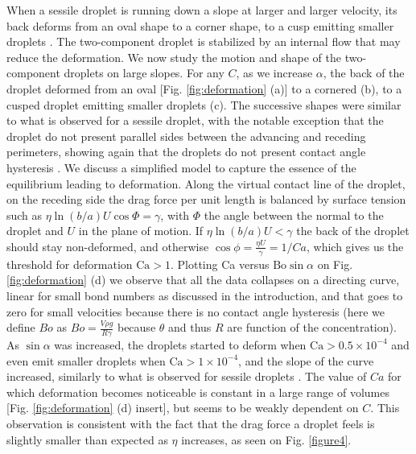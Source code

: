 \documentclass[aps,prl,reprint,superscriptaddress,amsmath,amssymb,]{revtex4-1}
\begin{document}
When a sessile droplet is running down a slope at larger and larger velocity, its back deforms from an oval shape to a corner shape, to a cusp emitting smaller droplets \cite{Podgorski-2001, LeGrand-2005}. The two-component droplet is stabilized by an internal flow that may reduce the deformation. We now study the motion and shape of the two-component droplets on large slopes. For any $C$, as we increase $\alpha$, the back of the droplet deformed from an oval [Fig. \ref{fig:deformation} (a)] to a cornered (b), to a cusped droplet emitting smaller droplets (c). The successive shapes were similar to what is observed for a sessile droplet, with the notable exception that the droplet do not present parallel sides between the advancing and receding perimeters, showing again that the droplets do not present contact angle hysteresis \cite{dussan1983ability, huethorst1991motion}. We discuss a simplified model to capture the essence of the equilibrium leading to deformation. Along the virtual contact line of the droplet, on the receding side the drag force per unit length is balanced by surface tension such as $\eta \ln (b/a) U \cos{\Phi}= \gamma$, with $\Phi$ the angle between the normal to the droplet and $U$ in the plane of motion. If $\eta \ln (b/a) U < \gamma$ the back of the droplet should stay non-deformed, and otherwise  $\cos{\phi}= \frac{\eta U}{\gamma}= 1/Ca$, which gives us the threshold for deformation  $\mathrm{Ca}>1$. Plotting Ca versus $\mathrm{Bo} \sin{\alpha}$ on Fig. \ref{fig:deformation} (d) we observe that all the data collapses on a directing curve, linear for small bond numbers as discussed in the introduction, and that goes to zero for small velocities because there is no contact angle hysteresis (here we define $Bo$ as $Bo=\frac{V \rho g}{R \gamma}$ because $\theta$ and thus $R$ are function of the concentration). As $\sin{\alpha}$ was increased, the droplets started to deform when $\mathrm{Ca}>0.5 \times 10^{-4}$ and even emit smaller droplets when $\mathrm{Ca}>1 \times 10^{-4}$, and the slope of the curve increased, similarly to what is observed for sessile droplets \cite{Podgorski-2001, LeGrand-2005}. The value of $Ca$ for which deformation becomes noticeable is constant in a large range of volumes [Fig. \ref{fig:deformation} (d) insert], but seems to be weakly dependent on $C$. This observation is consistent with the fact that the drag force a droplet feels is slightly smaller than expected as $\eta$ increases, as seen on Fig. \ref{figure4}.

\end{document}
